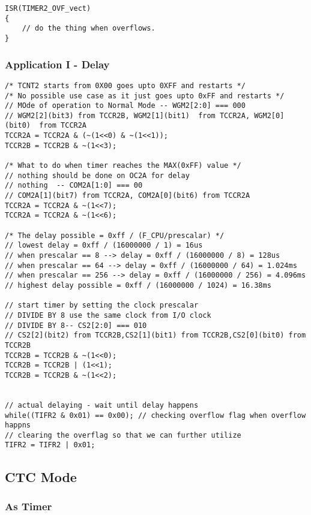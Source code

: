 \begin{verbatim}
ISR(TIMER2_OVF_vect)
{
    // do the thing when overflows.
}
\end{verbatim}



\subsubsection{Application I - Delay}
\begin{verbatim}
/* TCNT2 starts from 0X00 goes upto 0XFF and restarts */
/* No possible use case as it just goes upto 0xFF and restarts */
// MOde of operation to Normal Mode -- WGM2[2:0] === 000
// WGM2[2](bit3) from TCCR2B, WGM2[1](bit1)  from TCCR2A, WGM2[0](bit0)  from TCCR2A
TCCR2A = TCCR2A & (~(1<<0) & ~(1<<1));
TCCR2B = TCCR2B & ~(1<<3);

/* What to do when timer reaches the MAX(0xFF) value */
// nothing should be done on OC2A for delay
// nothing  -- COM2A[1:0] === 00
// COM2A[1](bit7) from TCCR2A, COM2A[0](bit6) from TCCR2A
TCCR2A = TCCR2A & ~(1<<7);
TCCR2A = TCCR2A & ~(1<<6);
    
/* The delay possible = 0xff / (F_CPU/prescalar) */
// lowest delay = 0xff / (16000000 / 1) = 16us
// when prescalar == 8 --> delay = 0xff / (16000000 / 8) = 128us
// when prescalar == 64 --> delay = 0xff / (16000000 / 64) = 1.024ms
// when prescalar == 256 --> delay = 0xff / (16000000 / 256) = 4.096ms
// highest delay possible = 0xff / (16000000 / 1024) = 16.38ms

// start timer by setting the clock prescalar
// DIVIDE BY 8 use the same clock from I/O clock
// DIVIDE BY 8-- CS2[2:0] === 010
// CS2[2](bit2) from TCCR2B,CS2[1](bit1) from TCCR2B,CS2[0](bit0) from TCCR2B
TCCR2B = TCCR2B & ~(1<<0);
TCCR2B = TCCR2B | (1<<1);
TCCR2B = TCCR2B & ~(1<<2);


// actual delaying - wait until delay happens
while((TIFR2 & 0x01) == 0x00); // checking overflow flag when overflow happns
// clearing the overflag so that we can further utilize
TIFR2 = TIFR2 | 0x01;
\end{verbatim}

\subsection{CTC Mode}
\subsubsection{As Timer}

